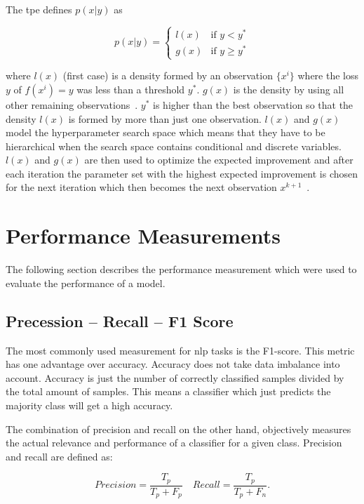 The \gls{tpe} defines $p(x|y)$ as 

\begin{equation}
p(x|y) =
\begin{cases}

l(x) & \text{if } y < y^* \\
g(x) & \text{if } y \geq y^*

\end{cases}
\end{equation}

where $l(x)$ {(first case)} is a density formed by an observation $\{x^i\}$ where the loss $y$ of $f(x^i)=y$ was less than a threshold $y^*$. $g(x)$ is the density by using all other remaining observations~\cite{Bergstra2013a}. $y^*$ is higher than the best observation so that the density $l(x)$ is formed by more than just one observation. $l(x)$ and $g(x)$ model the hyperparameter search space which means that they have to be hierarchical when the search space contains conditional and discrete variables. $l(x)$ and $g(x)$ are then used to optimize the expected improvement and after each iteration the parameter set with the highest expected improvement is chosen for the next iteration which then becomes the next observation $x^{k+1}$~\cite{Bergstra2013a}. 

\section{Performance Measurements}
The following section describes the performance measurement which were used to evaluate the performance of a model.


\subsection{Precession -- Recall -- F1 Score}
The most commonly used measurement for \gls{nlp} tasks is the F1-score. This metric has one advantage over accuracy. Accuracy does not take data imbalance into account. Accuracy is just the number of correctly classified samples divided by the total amount of samples. This means a classifier which just predicts the majority class will get a high accuracy.
\medskip

The combination of precision and recall on the other hand, objectively measures the actual relevance and performance of a classifier for a given class. Precision and recall are defined as:

\begin{equation}
Precision = \frac{T_p}{T_p+F_p} \quad Recall = \frac{T_p}{T_p+F_n}.
\end{equation}


